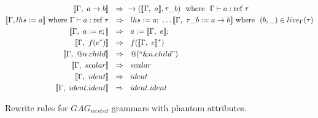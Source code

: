 \begin{figure*}
\begin{center}
\begin{align*}
\llbracket \Gamma, ~ a \rightarrow b \rrbracket  & ~~ \Rightarrow ~~ \rightarrow(\llbracket \Gamma, ~ a \rrbracket, \tau\_b) ~~ \text{where} ~~ \Gamma \vdash a : \text{ref} ~ \tau \\
\llbracket \Gamma, lhs := a \rrbracket ~ \text{where}~ \Gamma \vdash a : \text{ref} ~ \tau & ~~ \Rightarrow ~~ lhs := a; ~ \ldots \llbracket \Gamma, ~ \tau\_b := a \rightarrow b \rrbracket ~ \text{where} ~~ (b, \_) \in live_\Gamma(\tau)  \\
\llbracket \Gamma, ~ a := e; \rrbracket & ~~ \Rightarrow ~~  a := \llbracket \Gamma, ~ e \rrbracket; \\
\llbracket \Gamma, ~ f (e^{*}) \rrbracket & ~~ \Rightarrow ~~ f(\llbracket \Gamma, ~ e\rrbracket^{*}) \\
\llbracket \Gamma, ~ @n.child \rrbracket & ~~ \Rightarrow ~~ @(``\&n .child") \\
\llbracket \Gamma, ~ scalar \rrbracket & ~~ \Rightarrow ~~ scalar \\
\llbracket \Gamma, ~ ident \rrbracket & ~~ \Rightarrow ~~ ident \\
\llbracket \Gamma, ~ ident.ident \rrbracket & ~~ \Rightarrow ~~ ident.ident \\
\end{align*}

\end{center}
\caption{Rewrite rules for $GAG_{nested}$ grammars with phantom attributes.}
\label{fig:nestedrewrites}
\end{figure*}